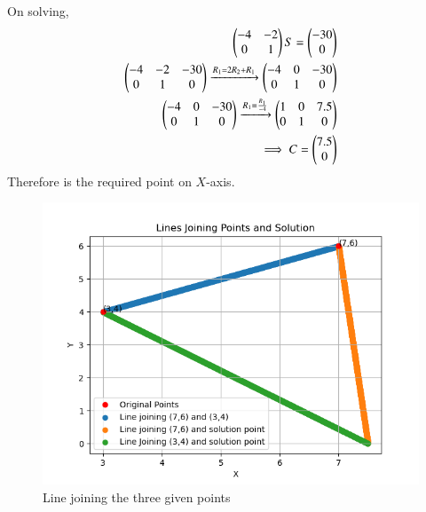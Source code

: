 \documentclass[journal]{IEEEtran}
\begin{document}
On solving,
\begin{align}
    \begin{pmatrix}-4 & -2 \\0 & 1\end{pmatrix}S = \begin{pmatrix}-30 \\ 0\end{pmatrix}\\
    \begin{pmatrix}-4 & -2 & -30 \\ 0 & 1 & 0\end{pmatrix} \xrightarrow{R_1 = 2R_2 + R_1 } \begin{pmatrix}-4 & 0 & -30 \\ 0 & 1 & 0\end{pmatrix}\\
    \begin{pmatrix}-4 & 0 & -30 \\ 0 & 1 & 0\end{pmatrix} \xrightarrow{R_1 = \frac{R_1}{-4}}
    \begin{pmatrix}1 & 0 & 7.5 \\ 0 & 1 & 0\end{pmatrix}\\
    \implies C = \begin{pmatrix}7.5\\0\end{pmatrix}\\
\end{align}
Therefore  is the required point on $X$-axis.    
\begin{figure}[h!]
   \centering
   \includegraphics[width=0.7\linewidth]{figs/fig.png}
   \caption{Line joining the three given points}
\end{figure}
\end{document}
